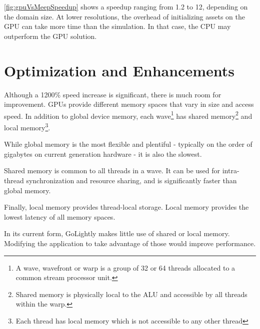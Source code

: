 \autoref{fig:gpuVsMeepSpeedup} shows a speedup ranging from 1.2 to 12, depending on the domain size. At lower resolutions, the overhead of initializing assets on the GPU can take more time than the simulation. In that case, the CPU may outperform the GPU solution.

\section{Optimization and Enhancements}

Although a 1200\% speed increase is significant, there is much room for improvement. GPUs provide different memory spaces that vary in size and access speed. In addition to global device memory, each wave\footnote{A wave, wavefront or warp is a group of 32 or 64 threads allocated to a common stream processor unit.} has shared memory\footnote{Shared memory is physically local to the ALU and accessible by all threads within the warp.} and local memory\footnote{Each thread has local memory which is not accessible to any other thread}.

While global memory is the most flexible and plentiful - typically on the order of gigabytes on current generation hardware - it is also the slowest. 

Shared memory is common to all threads in a wave. It can be used for intra-thread synchronization and resource sharing, and is significantly faster than global memory.

Finally, local memory provides thread-local storage. Local memory provides the lowest latency of all memory spaces.

In its current form, GoLightly makes little use of shared or local memory. Modifying the application to take advantage of those would improve performance.







